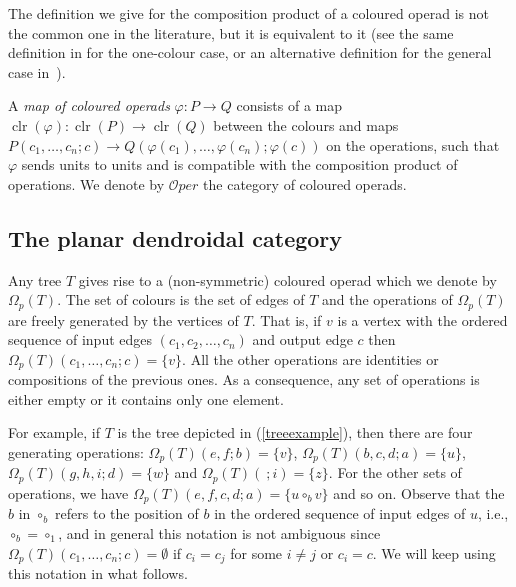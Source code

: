 \documentclass[a4paper]{amsart}
\theoremstyle{plain}
\theoremstyle{definition}
\theoremstyle{remark}
\DeclareMathOperator{\clr}{clr}
\newcommand{\To}{\longrightarrow}
\newcommand{\Oper}{\mathcal{O}per}
\numberwithin{equation}{section}
\numberwithin{figure}{section}
\begin{document}
The definition we give for the composition product of a coloured operad is not the common one in the literature, but it is
equivalent to it (see the same definition in \cite{markl} for the one-colour case, or an alternative definition for the
general case in~\cite{bergermoerdijk,leinster,moerdijkweiss}).


A \textit{map of coloured operads} $\varphi\colon P\To Q$ consists of a map $\clr(\varphi)\colon
    \clr(P)\To \clr(Q)$ between the colours and maps
$P(c_1,\ldots, c_n;c)\To Q(\varphi(c_1),\ldots,
    \varphi(c_n);\varphi(c))$ on the operations, such that $\varphi$
sends units to units and is compatible with the composition product
of operations. We denote by $\Oper$ the category of coloured operads.

\subsection{The planar dendroidal category }\label{the basic category}
Any tree $T$ gives rise to a (non-symme\-tric) coloured operad which
we denote by $\Omega_p(T)$. The set of colours is the set of edges of
$T$ and the operations of $\Omega_p(T)$ are freely generated by the
vertices of $T$. That is, if $v$ is a vertex with the ordered
sequence of input edges $(c_1, c_2, \ldots, c_n)$ and output edge
$c$ then $\Omega_p(T)(c_1,\ldots,c_n;c)=\{v\}$. All the other
operations are identities or compositions of the previous ones. As a
consequence, any set of operations is either empty or it contains
only one element.

For example, if $T$ is the tree depicted in (\ref{treeexample}), then there are four generating operations:
$\Omega_p(T)(e,f;b)=\{v\}$, $\Omega_p(T)(b,c,d;a)=\{u\}$, $\Omega_p(T)(g,h,i;d)=\{w\}$ and $\Omega_p(T)(\ ;i)=\{z\}$.
For the other sets of operations, we have $\Omega_p(T)(e,f,c,d;a)=\{u\circ_b v\}$ and so on.
Observe that the $b$ in $\circ_b$ refers to the position of $b$ in the ordered sequence of input edges of $u$, i.e.,
$\circ_b=\circ_1$, and in general this notation is not ambiguous since $\Omega_p(T)(c_1,\ldots, c_n;c)=\emptyset$ if $c_i=c_j$
for some $i\neq j$ or $c_i=c$. We will keep using this notation in what follows.
\end{document}
